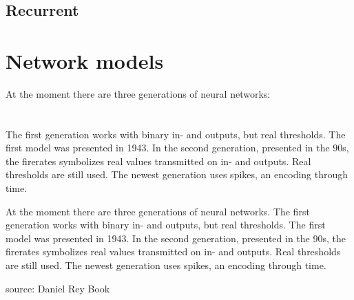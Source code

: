 \documentclass[10pt,a4paper,DIV=11]{scrreprt}
\begin{document}
\subsection{Recurrent}

\section{Network models}
At the moment there are three generations of neural networks: \\


   \\
\\

The first generation works with binary in- and outputs, but real thresholds. The first model was presented in 1943.
In the second generation, presented in the 90s, the firerates symbolizes real values transmitted on in- and outputs. Real thresholds are still used.
The newest generation uses spikes, an encoding through time.

At the moment there are three generations of neural networks. 
The first generation works with binary in- and outputs, but real thresholds. The first model was presented in 1943.
In the second generation, presented in the 90s, the firerates symbolizes real values transmitted on in- and outputs. Real thresholds are still used.
The newest generation uses spikes, an encoding through time.


source: Daniel Rey Book
\end{document}
